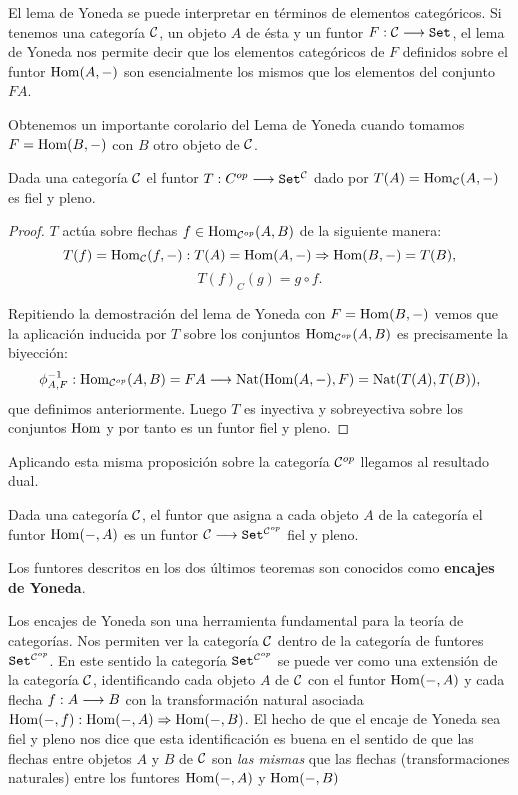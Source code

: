El lema de Yoneda se puede interpretar en términos de elementos
categóricos. Si tenemos una categoría $\mathcal{C}$, un objeto $A$ de ésta
y un funtor $F : \mathcal{C}\longrightarrow \texttt{Set}$, el lema de Yoneda nos permite
decir que los elementos categóricos de $F$ definidos sobre
el funtor $\operatorname{Hom}(A, -)$ son esencialmente los mismos que los
elementos del conjunto $F A$.

Obtenemos un importante corolario del Lema de Yoneda cuando tomamos
$F = \operatorname{Hom}(B, -)$ con $B$ otro objeto de $\mathcal{C}$.

\begin{theorem}
  Dada una categoría $\mathcal{C}$
  el funtor $T : C^{op}\longrightarrow \texttt{Set}^{\mathcal{C}}$ dado por
  $T(A) = \operatorname{Hom}_{\mathcal{C}}(A, -)$ es fiel y pleno.
\end{theorem}
\begin{proof}
  $T$ actúa sobre flechas
  $f \in \operatorname{Hom}_{\mathcal{C}^{op}}(A, B)$
  de la siguiente manera:
  $$T(f) = \operatorname{Hom}_{\mathcal{C}}(f, -) : T(A) = \operatorname{Hom}(A, -)\Rightarrow \operatorname{Hom}(B, -) = T(B),$$
  $$T(f)_C(g) = g \circ f.$$

  Repitiendo la demostración del lema de Yoneda con
  $F = \operatorname{Hom}(B, -)$ vemos que la aplicación inducida por
  $T$ sobre los conjuntos $\operatorname{Hom}_{\mathcal{C}^{op}}(A, B)$ es precisamente la
  biyección:
  $$\phi_{A, F}^{-1} : 
    \operatorname{Hom}_{\mathcal{C}^{op}}(A, B) = FA
  \longrightarrow 
    \operatorname{Nat}(\operatorname{Hom}(A, -), F) = \operatorname{Nat}(T(A), T(B))
 ,$$
  que definimos anteriormente.
  Luego $T$ es inyectiva y sobreyectiva sobre los conjuntos
  $\operatorname{Hom}$ y
  por tanto es un funtor fiel y pleno.
\end{proof}

Aplicando esta misma proposición sobre la categoría $\mathcal{C}^{op}$ llegamos
al resultado dual.
\begin{theorem}
  Dada una categoría $\mathcal{C}$, el funtor que asigna a cada objeto
  $A$ de la categoría el funtor $\operatorname{Hom}(-, A)$ es un funtor
  $\mathcal{C}\longrightarrow \texttt{Set}^{\mathcal{C}^{op}}$ fiel y pleno.
\end{theorem}

Los funtores descritos en los dos últimos teoremas son conocidos
como \textbf{encajes de Yoneda}.

Los encajes de Yoneda son una herramienta fundamental para la teoría
de categorías. Nos permiten ver la categoría $\mathcal{C}$ dentro de la
categoría de funtores $\texttt{Set}^{\mathcal{C}^{op}}$. En este sentido
la categoría $\texttt{Set}^{\mathcal{C}^{op}}$ se puede ver como una extensión
de la categoría $\mathcal{C}$, identificando cada objeto $A$ de $\mathcal{C}$
con el funtor $\operatorname{Hom}(-, A)$ y cada flecha $f : A\longrightarrow B$ con la
transformación natural asociada
$\operatorname{Hom}(-, f) : \operatorname{Hom}(-, A)\Rightarrow \operatorname{Hom}(-, B)$. El hecho
de que el encaje de
Yoneda sea fiel y pleno nos dice que esta identificación es buena
en el sentido de que las flechas entre objetos $A$ y $B$ de $\mathcal{C}$
son \textit{las mismas} que las flechas (transformaciones naturales)
entre los funtores
$\operatorname{Hom}(-, A)$ y $\operatorname{Hom}(-, B)$

